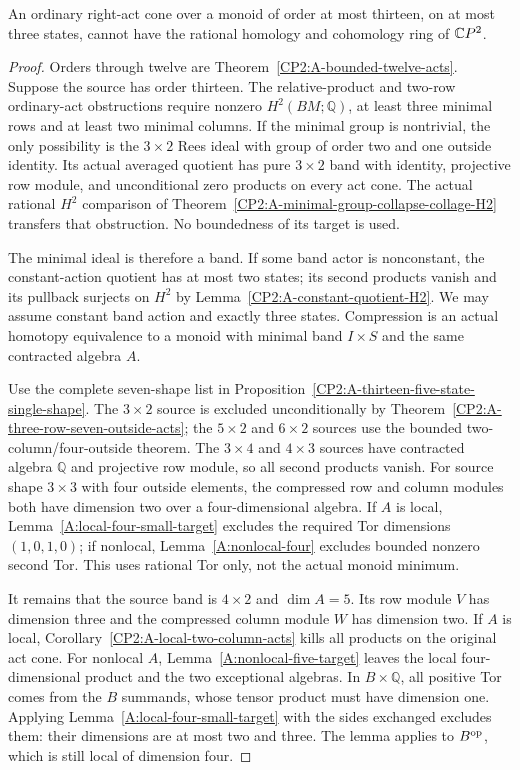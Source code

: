 \begin{proposition}
\label{CP2:A-thirteen-three-state-rational}
An ordinary right-act cone over a monoid of order at most
thirteen, on at most three states, cannot have the rational
homology and cohomology ring of $\mathbb{C}P^2$.
\end{proposition}
\begin{proof}
Orders through twelve are
Theorem~\ref{CP2:A-bounded-twelve-acts}. Suppose the source
has order thirteen. The relative-product and two-row
ordinary-act obstructions require nonzero $H^2(BM;\mathbb Q)$,
at least three minimal rows and at least two minimal columns.
If the minimal group is nontrivial, the only possibility
is the $3\times2$ Rees ideal with group of order two and
one outside identity. Its actual averaged quotient has
pure $3\times2$ band with identity, projective row module,
and unconditional zero products on every act cone. The
actual rational $H^2$ comparison of
Theorem~\ref{CP2:A-minimal-group-collapse-collage-H2} transfers
that obstruction. No boundedness of its target is used.

The minimal ideal is therefore a band. If some band actor
is nonconstant, the constant-action quotient has at most
two states; its second products vanish and its pullback
surjects on $H^2$ by Lemma~\ref{CP2:A-constant-quotient-H2}.
We may assume constant band action and exactly three
states. Compression is an actual homotopy equivalence
to a monoid with minimal band $I\times S$ and the same
contracted algebra $A$.

Use the complete seven-shape list in
Proposition~\ref{CP2:A-thirteen-five-state-single-shape}.
The $3\times2$ source is excluded unconditionally by
Theorem~\ref{CP2:A-three-row-seven-outside-acts}; the
$5\times2$ and $6\times2$ sources use the bounded
two-column/four-outside theorem. The $3\times4$ and
$4\times3$ sources have contracted algebra $\mathbb Q$
and projective row module, so all second products vanish.
For source shape $3\times3$ with four outside elements,
the compressed row and column modules both have dimension
two over a four-dimensional algebra. If $A$ is local,
Lemma~\ref{A:local-four-small-target} excludes the required
Tor dimensions $(1,0,1,0)$; if nonlocal,
Lemma~\ref{A:nonlocal-four} excludes bounded nonzero
second Tor. This uses rational Tor only, not the actual
monoid minimum.

It remains that the source band is $4\times2$ and
$\dim A=5$. Its row module $V$ has dimension three and
the compressed column module $W$ has dimension two.
If $A$ is local, Corollary~\ref{CP2:A-local-two-column-acts}
kills all products on the original act cone. For nonlocal
$A$, Lemma~\ref{A:nonlocal-five-target} leaves the local
four-dimensional product and the two exceptional algebras.
In $B\times\mathbb Q$, all positive Tor comes from the
$B$ summands, whose tensor product must have dimension
one. Applying Lemma~\ref{A:local-four-small-target} with
the sides exchanged excludes them: their dimensions are
at most two and three. The lemma applies to $B^{\rm op}$,
which is still local of dimension four.


\end{proof}
